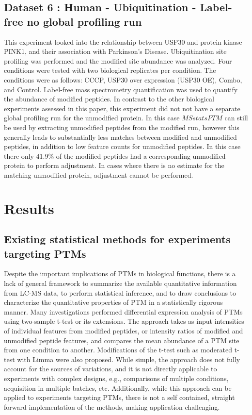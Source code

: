\documentclass[mcp]{article}
\numberwithin{table}{section}
\begin{document}
\subsection*{Dataset 6 : Human - Ubiquitination - Label-free no global profiling run}

This experiment looked into the relationship between USP30 and protein kinase PINK1, and their association with Parkinson’s Disease. Ubiquitination site profiling was performed and the modified site abundance was analyzed. Four conditions were tested with two biological replicates per condition. The conditions were as follows: CCCP, USP30 over expression (USP30 OE), Combo, and Control. Label-free mass spectrometry quantification was used to quantify the abundance of modified peptides. In contrast to the other biological experiments assessed in this paper, this experiment did not not have a separate global profiling run for the unmodified protein. In this case $MSstatsPTM$ can still be used by extracting unmodified peptides from the modified run, however this generally leads to substantially less matches between modified and unmodified peptides, in addition to low feature counts for unmodified peptides. In this case there only 41.9\% of the modified peptides had a corresponding unmodified protein to perform adjustment. In cases where there is no estimate for the matching unmodified protein, adjustment cannot be performed.

\section*{Results}

\subsection*{Existing statistical methods for experiments targeting PTMs}

Despite the important implications of PTMs in biological functions, there is a lack of general framework to summarize the available quantitative information from LC-MS data, to perform statistical inference, and to draw conclusions to characterize the quantitative properties of PTM in a statistically rigorous manner. Many investigations performed differential expression analysis of PTMs using two-sample t-test or its extensions. The approach takes as input intensities of individual features from modified peptides, or intensity ratios of modified and unmodified peptide features, and compares the mean abundance of a PTM site from one condition to another. Modifications of the t-test such as moderated t-test with Limma were also proposed\cite{Zhu}. While simple, the approach does not fully account for the sources of variations, and it is not directly applicable to experiments with complex designs, e.g., comparisons of multiple conditions, acquisition in multiple batches, etc. Additionally, while this approach can be applied to experiments targeting PTMs, there is not a self contained, straight forward implementation of the methods, making application challenging. 
\end{document}
